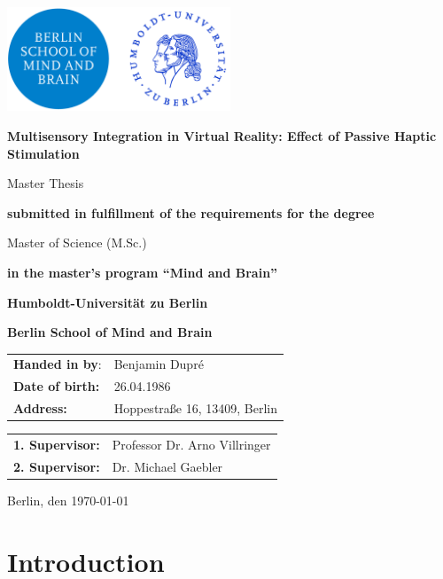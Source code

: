 \documentclass[12pt,oneside,openright]{report}
\begin{document}
\begin{titlepage}
    \centering
    \includegraphics[width=0.5\textwidth]{Hu-logo.png}
    \vspace{2cm}
    
    {\huge \textbf{Multisensory Integration in Virtual Reality: Effect of Passive Haptic Stimulation}\par}
    \vspace{2cm}
    {\LARGE Master Thesis\par}
    \vspace{0.5cm}
    {\textbf{submitted in fulfillment of the requirements for the degree}\par}
    Master of Science (M.Sc.)\par
    {\textbf{in the master's program ``Mind and Brain''}\par}
    \vspace{1.5cm}
    {\textbf{Humboldt-Universität zu Berlin}\par}
    {\textbf{Berlin School of Mind and Brain}\par}
    \vfill
    \raggedright
    \begin{tabular}{ll}
        \textbf{Handed in by}: & Benjamin Dupré \\
        \textbf{Date of birth:} & 26.04.1986\\
       \textbf{ Address:} & Hoppestraße 16, 13409, Berlin \\
    \end{tabular}
    \vfill
    \begin{tabular}{ll}
        \textbf{1. Supervisor:}& Professor Dr. Arno Villringer \\
        \textbf{2. Supervisor:}& Dr. Michael Gaebler  \\
    \end{tabular}
    \vfill
    {Berlin, den \today \par}
\end{titlepage}


\section*{Introduction}
\end{document}
